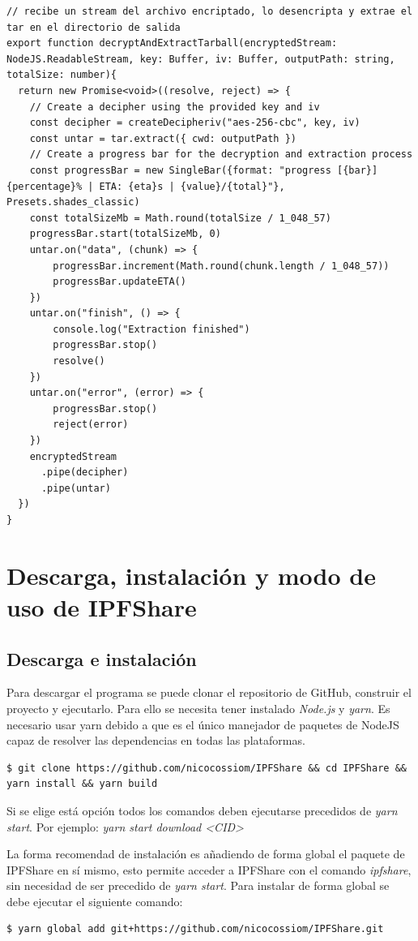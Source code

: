 \begin{verbatim}
// recibe un stream del archivo encriptado, lo desencripta y extrae el tar en el directorio de salida
export function decryptAndExtractTarball(encryptedStream: NodeJS.ReadableStream, key: Buffer, iv: Buffer, outputPath: string, totalSize: number){
  return new Promise<void>((resolve, reject) => {
    // Create a decipher using the provided key and iv
    const decipher = createDecipheriv("aes-256-cbc", key, iv)
    const untar = tar.extract({ cwd: outputPath })
    // Create a progress bar for the decryption and extraction process
    const progressBar = new SingleBar({format: "progress [{bar}] {percentage}% | ETA: {eta}s | {value}/{total}"}, Presets.shades_classic)
    const totalSizeMb = Math.round(totalSize / 1_048_57)
    progressBar.start(totalSizeMb, 0)
    untar.on("data", (chunk) => {
        progressBar.increment(Math.round(chunk.length / 1_048_57))
        progressBar.updateETA()
    })
    untar.on("finish", () => {
        console.log("Extraction finished")
        progressBar.stop()
        resolve()
    })
    untar.on("error", (error) => {
        progressBar.stop()
        reject(error)
    })
    encryptedStream
      .pipe(decipher)
      .pipe(untar)
  })
}
\end{verbatim}

\section{Descarga, instalación y modo de uso de IPFShare}

\subsection{Descarga e instalación}

Para descargar el programa se puede clonar el repositorio de GitHub, construir el proyecto y ejecutarlo. Para ello se necesita tener instalado \textit{Node.js} y \textit{yarn}. Es necesario usar yarn debido a que es el único manejador de paquetes de NodeJS capaz de resolver las dependencias
en todas las plataformas.

\begin{verbatim}
$ git clone https://github.com/nicocossiom/IPFShare && cd IPFShare && yarn install && yarn build
\end{verbatim}
Si se elige está opción todos los comandos deben ejecutarse precedidos de \textit{yarn start}. Por ejemplo:
\textit{yarn start download <CID>}

La forma recomendad de instalación es añadiendo de forma global el paquete de IPFShare en sí mismo, esto permite acceder a IPFShare con el comando \textit{ipfshare}, sin necesidad de ser precedido de
\textit{yarn start}. Para instalar de forma global se debe ejecutar el siguiente comando:
\begin{verbatim}
$ yarn global add git+https://github.com/nicocossiom/IPFShare.git
\end{verbatim}

